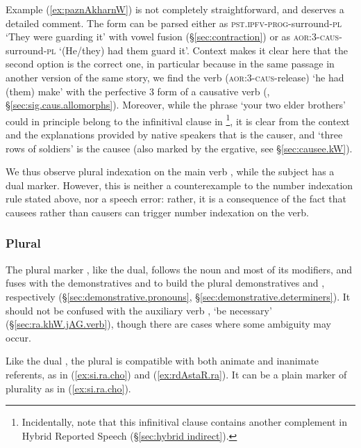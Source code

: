 Example (\ref{ex:paznAkharnW}) is not completely straightforward, and deserves a detailed comment. The form  can be parsed either as  \textsc{pst}.\textsc{ipfv}-\textsc{prog}-surround-\textsc{pl} `They were guarding it' with vowel fusion (§\ref{sec:contraction}) or as  \textsc{aor}:3\flobv{}-\textsc{caus}-surround-\textsc{pl} `(He/they) had them guard it'. Context makes it clear here that the second option is the correct one, in particular because in the same passage in another version of the same story, we find the verb  (\textsc{aor}:3\flobv{}-\textsc{caus}-release) `he had (them) make' with the perfective 3\flobv{} form of a causative verb (\citealt[242]{jacques16complementation}, §\ref{sec:sig.caus.allomorphs}). Moreover, while the phrase   `your two elder brothers' could in principle belong to the infinitival clause in \footnote{Incidentally, note that this infinitival clause contains another complement in Hybrid Reported Speech (§\ref{sec:hybrid indirect}).}, it is clear from the context and the explanations provided by native speakers that  is the causer, and  `three rows of soldiers' is the causee (also marked by the ergative, see §\ref{sec:causee.kW}). 

We thus observe plural indexation  on the main verb , while the subject   has a dual marker. However, this is neither a counterexample to the number indexation rule stated above, nor a speech error: rather, it is a consequence of the fact that causees rather than causers can trigger number indexation on the verb.

\subsubsection{Plural} \label{sec:plural.determiners}
The plural marker , like the dual, follows the noun and most of its modifiers, and fuses with the demonstratives  and  to build the plural demonstratives  and , respectively (§\ref{sec:demonstrative.pronouns}, §\ref{sec:demonstrative.determiners}).  It should not be confused with the auxiliary verb , `be necessary' (§\ref{sec:ra.khW.jAG.verb}), though there are cases where some ambiguity may occur.

Like the dual , the plural  is compatible with both animate and inanimate referents, as in (\ref{ex:si.ra.cho}) and (\ref{ex:rdAstaR.ra}). It can be a plain marker of plurality as in (\ref{ex:si.ra.cho}).

